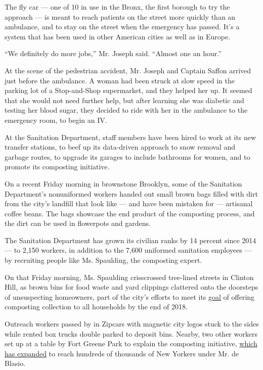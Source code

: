 The fly car --- one of 10 in use in the Bronx, the first borough to try
the approach --- is meant to reach patients on the street more quickly
than an ambulance, and to stay on the street when the emergency has
passed. It's a system that has been used in other American cities as
well as in Europe.

``We definitely do more jobs,'' Mr. Joseph said. ``Almost one an hour.''

At the scene of the pedestrian accident, Mr. Joseph and Captain Saffon
arrived just before the ambulance. A woman had been struck at slow speed
in the parking lot of a Stop-and-Shop supermarket, and they helped her
up. It seemed that she would not need further help, but after learning
she was diabetic and testing her blood sugar, they decided to ride with
her in the ambulance to the emergency room, to begin an IV.

At the Sanitation Department, staff members have been hired to work at
its new transfer stations, to beef up its data-driven approach to snow
removal and garbage routes, to upgrade its garages to include bathrooms
for women, and to promote its composting initiative.

On a recent Friday morning in brownstone Brooklyn, some of the
Sanitation Department's nonuniformed workers handed out small brown bags
filled with dirt from the city's landfill that look like --- and have
been mistaken for --- artisanal coffee beans. The bags showcase the end
product of the composting process, and the dirt can be used in
flowerpots and gardens.

The Sanitation Department has grown its civilian ranks by 14 percent
since 2014 --- to 2,150 workers, in addition to the 7,600 uniformed
sanitation employees --- by recruiting people like Ms. Spaulding, the
composting expert.

On that Friday morning, Ms. Spaulding crisscrossed tree-lined streets in
Clinton Hill, as brown bins for food waste and yard clippings clattered
onto the doorsteps of unsuspecting homeowners, part of the city's
efforts to meet its
\href{https://www.nytimes3xbfgragh.onion/2014/05/31/nyregion/composting-in-new-york-city-pilot-program-expands.html}{goal}
of offering composting collection to all households by the end of 2018.

Outreach workers passed by in Zipcars with magnetic city logos stuck to
the sides while rented box trucks double parked to deposit bins. Nearby,
two other workers set up at a table by Fort Greene Park to explain the
composting initiative,
\href{https://www.nytimes3xbfgragh.onion/2015/05/22/nyregion/with-compost-program-keeping-waste-from-going-to-waste.html}{which
has expanded} to reach hundreds of thousands of New Yorkers under Mr. de
Blasio.

